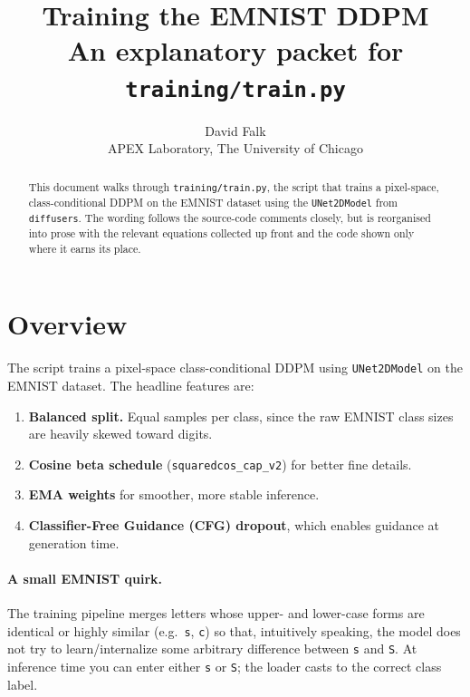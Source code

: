 \documentclass[11pt]{article}
\title{\bfseries Training the EMNIST DDPM\\[2pt]
\large An explanatory packet for \texttt{training/train.py}}
\author{David Falk \\ APEX Laboratory, The University of Chicago}
\date{}
\newcommand{\code}[1]{\texttt{#1}}
\begin{document}
\maketitle

\begin{abstract}
This document walks through \code{training/train.py}, the script that trains a
pixel-space, class-conditional DDPM on the EMNIST dataset using the
\code{UNet2DModel} from \texttt{diffusers}. The wording follows the source-code
comments closely, but is reorganised into prose with the relevant equations
collected up front and the code shown only where it earns its place.
\end{abstract}

\tableofcontents

\section{Overview}

The script trains a pixel-space class-conditional DDPM using \code{UNet2DModel}
on the EMNIST dataset. The headline features are:

\begin{enumerate}[leftmargin=*]
  \item \textbf{Balanced split.} Equal samples per class, since the raw EMNIST
        class sizes are heavily skewed toward digits.
  \item \textbf{Cosine beta schedule} (\code{squaredcos\_cap\_v2}) for better
        fine details.
  \item \textbf{EMA weights} for smoother, more stable inference.
  \item \textbf{Classifier-Free Guidance (CFG) dropout}, which enables guidance
        at generation time.
\end{enumerate}

\paragraph{A small EMNIST quirk.} The training pipeline merges letters whose
upper- and lower-case forms are identical or highly similar (e.g.\ \texttt{s},
\texttt{c}) so that, intuitively speaking, the model does not try to
learn/internalize some arbitrary difference between \texttt{s} and \texttt{S}.
At inference time you can enter either \texttt{s} or \texttt{S}; the loader
casts to the correct class label.
\end{document}
